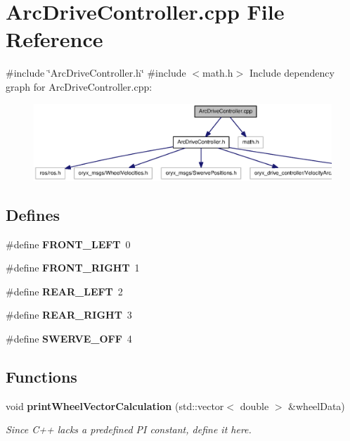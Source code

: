 \section{\-Arc\-Drive\-Controller.\-cpp \-File \-Reference}
\label{ArcDriveController_8cpp}
{\ttfamily \#include \char`\"{}\-Arc\-Drive\-Controller.\-h\char`\"{}}\*
{\ttfamily \#include $<$math.\-h$>$}\*
\-Include dependency graph for \-Arc\-Drive\-Controller.\-cpp\-:
\nopagebreak
\begin{figure}[H]
\begin{center}
\leavevmode
\includegraphics[width=350pt]{ArcDriveController_8cpp__incl}
\end{center}
\end{figure}
\subsection*{\-Defines}
\begin{DoxyCompactItemize}
\item 
\#define {\bf \-F\-R\-O\-N\-T\-\_\-\-L\-E\-F\-T}~0
\item 
\#define {\bf \-F\-R\-O\-N\-T\-\_\-\-R\-I\-G\-H\-T}~1
\item 
\#define {\bf \-R\-E\-A\-R\-\_\-\-L\-E\-F\-T}~2
\item 
\#define {\bf \-R\-E\-A\-R\-\_\-\-R\-I\-G\-H\-T}~3
\item 
\#define {\bf \-S\-W\-E\-R\-V\-E\-\_\-\-O\-F\-F}~4
\end{DoxyCompactItemize}
\subsection*{\-Functions}
\begin{DoxyCompactItemize}
\item 
void {\bf print\-Wheel\-Vector\-Calculation} (std\-::vector$<$ double $>$ \&wheel\-Data)
\begin{DoxyCompactList}\small\item\em \-Since \-C++ lacks a predefined \-P\-I constant, define it here. \end{DoxyCompactList}\end{DoxyCompactItemize}
